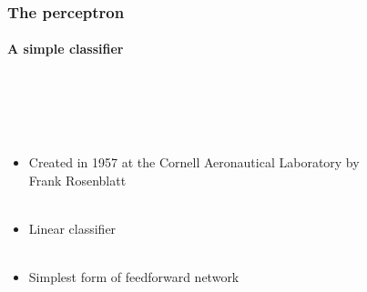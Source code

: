 \documentclass{beamer}
\begin{document}
\begin{frame}
\frametitle{The perceptron}
\framesubtitle{A simple classifier}
  \begin{columns}[T]
    \begin{column}{.5\textwidth}    \ \\ \ \\ 
    \ \\
    \begin{itemize}
    
 
     \item<2->Created in 1957 at the Cornell Aeronautical Laboratory by Frank Rosenblatt  \\ \
\item<3->Linear classifier \\ \

\item<4->Simplest form of feedforward network \\ \

\end{itemize}

    \end{column}
    \begin{column}{.5\textwidth}
\begin{figure}
 

\end{figure}
\end{column}
\end{columns}
\end{frame}
\end{document}
